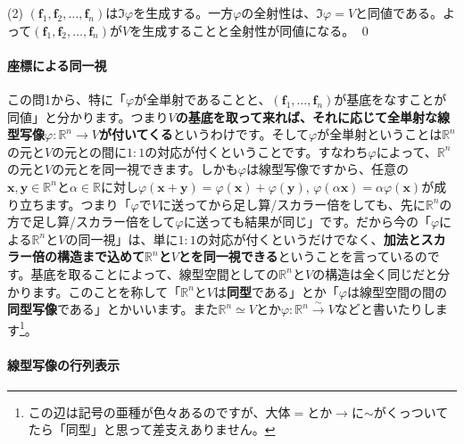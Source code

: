 \noindent (2) $(\bm{f}_1, \bm{f}_2, \ldots, \bm{f}_n)$は$\Im \varphi$を生成する。一方$\varphi$の全射性は、$\Im \varphi = V$と同値である。よって$(\bm{f}_1, \bm{f}_2, \ldots, \bm{f}_n)$が$V$を生成することと全射性が同値になる。 \qed

\paragraph{座標による同一視}

この問1から、特に「$\varphi$が全単射であることと、$(\bm{f}_1, \ldots, \bm{f}_n)$が基底をなすことが同値」と分かります。つまり\textbf{$V$の基底を取って来れば、それに応じて全単射な線型写像$\varphi\colon\mathbb{R}^n \rightarrow V$が付いてくる}というわけです。そして$\varphi$が全単射ということは$\mathbb{R}^n$の元と$V$の元との間に$1:1$の対応が付くということです。すなわち$\varphi$によって、$\mathbb{R}^n$の元と$V$の元とを同一視できます。しかも$\varphi$は線型写像ですから、任意の$\bm{x}, \bm{y}\in \mathbb{R}^n$と$\alpha \in \mathbb{R}$に対し$\varphi(\bm{x} + \bm{y}) = \varphi(\bm{x}) + \varphi(\bm{y})$, $\varphi(\alpha\bm{x}) = \alpha \varphi(\bm{x})$が成り立ちます。つまり「$\varphi$で$V$に送ってから足し算/スカラー倍をしても、先に$\mathbb{R}^n$の方で足し算/スカラー倍をして$\varphi$に送っても結果が同じ」です。だから今の「$\varphi$による$\mathbb{R}^n$と$V$の同一視」は、単に$1:1$の対応が付くというだけでなく、\textbf{加法とスカラー倍の構造まで込めて$\mathbb{R}^n$と$V$とを同一視できる}ということを言っているのです。基底を取ることによって、線型空間としての$\mathbb{R}^n$と$V$の構造は全く同じだと分かります。このことを称して「$\mathbb{R}^n$と$V$は\textbf{同型}である」とか「$\varphi$は線型空間の間の\textbf{同型写像}である」とかいいます。また$\mathbb{R}^n \simeq V$とか$\varphi\colon\mathbb{R}^n\xrightarrow{\sim}V$などと書いたりします\footnote{この辺は記号の亜種が色々あるのですが、大体$=$とか$\rightarrow$に$\sim$がくっついてたら「同型」と思って差支えありません。}。

\paragraph{線型写像の行列表示}

